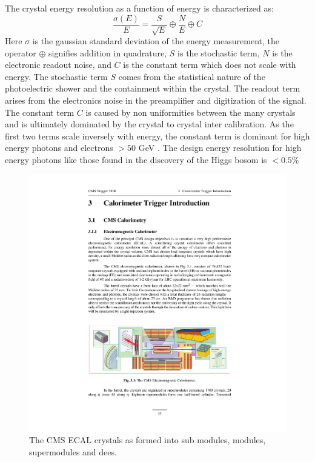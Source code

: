 The crystal energy resolution as a function of energy is characterized as:
\begin{equation}
\frac{\sigma(E)}{E} = \frac{S}{\sqrt{E}} \oplus \frac{N}{E} \oplus C
\end{equation}
Here $\sigma$ is the gaussian standard deviation of the energy measurement, the operator $\oplus$ signifies addition in quadrature, $S$ is 
the stochastic term, $N$ is the
electronic readout noise, and $C$ is the constant term which does not scale with energy. The 
stochastic term $S$ comes from the statistical nature of the photoelectric shower and the 
containment within the crystal. The readout term arises from the electronics noise in the preamplifier and digitization of the signal. The constant term $C$ is caused by non uniformities between
the many crystals and is ultimately dominated by the crystal to crystal inter calibration. As
the first two terms scale inversely with energy, the constant term is dominant for high energy photons and electrons $> 50$ GeV . 
The design energy resolution for high energy photons like those
found in the discovery of the Higgs bosom is $< 0.5\%$

\begin{figure}
\begin{center}
\includegraphics[width=.95\textwidth]{pics/cms_ecal_parts}
\end{center}
\caption{The CMS ECAL crystals as formed into sub modules, modules, supermodules and dees.}
\label{fig:ecal_crystal}
\end{figure}

